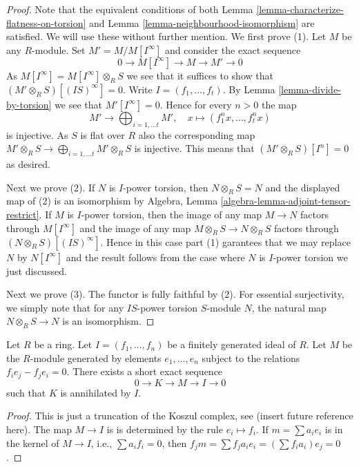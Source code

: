 \begin{proof}
Note that the equivalent conditions of both
Lemma \ref{lemma-characterize-flatness-on-torsion} and
Lemma \ref{lemma-neighbourhood-isomorphism}
are satisfied. We will use these without further mention.
We first prove (1). Let $M$ be any $R$-module.
Set $M' = M/M[I^\infty]$ and consider the exact sequence
$$
0 \to M[I^\infty] \to M \to M' \to 0
$$
As $M[I^\infty] = M[I^\infty] \otimes_R S$ we see that it suffices to
show that $(M' \otimes_R S)[(IS)^\infty] = 0$.
Write $I = (f_1, \ldots, f_t)$. By
Lemma \ref{lemma-divide-by-torsion}
we see that $M'[I^\infty] = 0$. Hence for every $n > 0$ the map
$$
M' \longrightarrow \bigoplus\nolimits_{i = 1, \ldots t} M',
\quad
x \longmapsto (f_1^n x, \ldots, f_t^n x)
$$
is injective. As $S$ is flat over $R$ also the corresponding map
$M' \otimes_R S \to \bigoplus_{i = 1, \ldots t} M' \otimes_R S$
is injective. This means that $(M' \otimes_R S)[I^n] = 0$ as desired.

\medskip\noindent
Next we prove (2). If $N$ is $I$-power torsion, then
$N \otimes_R S = N$ and the displayed map of (2) is an isomorphism by
Algebra, Lemma \ref{algebra-lemma-adjoint-tensor-restrict}.
If $M$ is $I$-power torsion, then the image of any map
$M \to N$ factors through $M[I^\infty]$ and the image of any map
$M \otimes_R S \to N \otimes_R S$ factors through
$(N \otimes_R S)[(IS)^\infty]$. Hence in this case
part (1) garantees that we may replace $N$ by $N[I^\infty]$
and the result follows from the case where $N$ is $I$-power torsion
we just discussed.

\medskip\noindent
Next we prove (3). The functor is fully faithful by (2).
For essential surjectivity, we simply note that for any $IS$-power torsion
$S$-module $N$, the natural map $N \otimes_R S \to N$ is an isomorphism.
\end{proof}

\begin{lemma}
\label{lemma-naive-Koszul-complex}
Let $R$ be a ring. Let $I = (f_1, \ldots, f_n)$ be a finitely generated ideal
of $R$. Let $M$ be the $R$-module generated by elements
$e_1, \ldots, e_n$ subject to the relations $f_i e_j - f_j e_i = 0$.
There exists a short exact sequence
$$
0 \to K \to M \to I \to 0
$$
such that $K$ is annihilated by $I$.
\end{lemma}

\begin{proof}
This is just a truncation of the Koszul complex, see (insert future
reference here).
The map $M \to I$ is is determined by the rule $e_i \mapsto f_i$. If
$m = \sum a_i e_i$ is in the kernel of $M \to I$, i.e., $\sum a_i f_i = 0$,
then $f_j m = \sum f_j a_i e_i = (\sum f_i a_i) e_j = 0$.
\end{proof}

